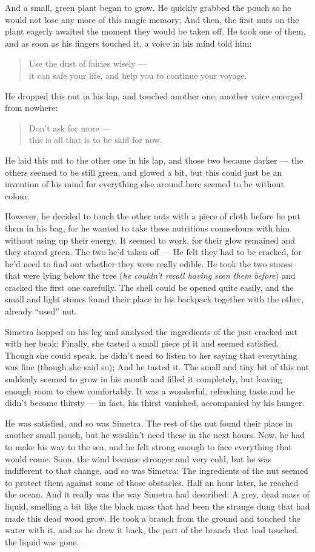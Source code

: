 And a small, green plant began to grow. He quickly grabbed the pouch so he would not lose any more of this magic memory; And then, the first nuts on the plant eagerly awaited the moment they would be taken off. 
He took one of them, and as soon as his fingers touched it, a voice in his mind told him:
\begin{quote}
Use the dust of fairies wisely ---\\
it can safe your life, and help you to continue your voyage.
\end{quote}
He dropped this nut in his lap, and touched another one; another voice emerged from nowhere:
\begin{quote}
Don't ask for more ---\\
this is all that is to be said for now.
\end{quote}
He laid this nut to the other one in his lap, and those two became darker --- the others seemed to be still green, and glowed a bit,
but this could just be an invention of his mind for everything else around here seemed to be without colour.

However, he decided to touch the other nuts with a piece of cloth before he put them in his bag, for he wanted to take these nutritious counselours with him without using up their energy.
It seemed to work, for their glow remained and they stayed green. The two he'd taken off --- He felt they had to be cracked, for he'd need to find out whether they were really edible.
He took the two stones that were lying below the tree (\emph{he couldn't recall having seen them before}) and cracked the first one carefully.
The shell could be opened quite easily, and the small and light stones found their place in his backpack together with the other, already \enquote{used} nut.

Simetra hopped on his leg and analysed the ingredients of the just cracked nut with her beak; Finally, she tasted a small piece pf it and seemed satisfied. Though she could speak, he didn't need to listen to her saying that everything was fine (though she said so); And he tasted it. 
The small and tiny bit of this nut suddenly seemed to grow in his mouth and filled it completely, but leaving enough room to chew comfortably. It was a wonderful, refreshing taste and he didn't become thirsty ---
in fact, his thirst vanished, accompanied by his hunger. 

He was satisfied, and so was Simetra. The rest of the nut found their place in another small pouch, but he wouldn't need these in the next hours. 
Now, he had to make his way to the sea, and he felt strong enough to face everything that would come. 
Soon, the wind became stronger and very cold, but he was indifferent to that change, and so was Simetra: The ingredients of the nut seemed to protect them against some of those obstacles. Half an hour later, he reached the ocean. 
And it really was the way Simetra had described: A grey, dead mass of liquid, smelling a bit like the black mass that had been the strange dung that had made this dead wood grow. He took a branch from the ground and touched the water with it, and as he drew it back, the part of the branch that had touched the liquid was gone.

